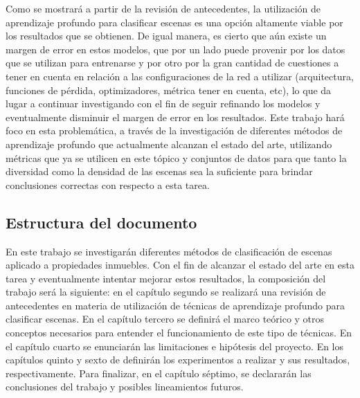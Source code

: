 Como se mostrará a partir de la revisión de antecedentes, la utilización de aprendizaje profundo para clasificar escenas es una opción altamente viable por los resultados que se obtienen. De igual manera, es cierto que aún existe un margen de error en estos modelos, que por un lado puede provenir por los datos que se utilizan para entrenarse y por otro por la gran cantidad de cuestiones a tener en cuenta en relación a las configuraciones de la red a utilizar (arquitectura, funciones de pérdida, optimizadores, métrica tener en cuenta, etc), lo que da lugar a continuar investigando con el fin de seguir refinando los modelos y eventualmente disminuir el margen de error en los resultados. Este trabajo hará foco en esta problemática, a través de la investigación de diferentes métodos de aprendizaje profundo que actualmente alcanzan el estado del arte, utilizando métricas que ya se utilicen en este tópico y conjuntos de datos para que tanto la diversidad como la densidad de las escenas sea la suficiente para brindar conclusiones correctas con respecto a esta tarea.


\subsection{Estructura del documento}
En este trabajo se investigarán diferentes métodos de clasificación de escenas aplicado a propiedades inmuebles. Con el fin de alcanzar el estado del arte en esta tarea y eventualmente intentar mejorar estos resultados, la composición del trabajo será la siguiente: en el capítulo segundo se realizará una revisión de antecedentes en materia de utilización de técnicas de aprendizaje profundo para clasificar escenas. En el capítulo tercero se definirá el marco teórico y otros conceptos necesarios para entender el funcionamiento de este tipo de técnicas. En el capítulo cuarto se enunciarán las limitaciones e hipótesis del proyecto. En los capítulos quinto y sexto de definirán los experimentos a realizar y sus resultados, respectivamente. Para finalizar, en el capítulo séptimo, se declararán las conclusiones del trabajo y posibles lineamientos futuros.